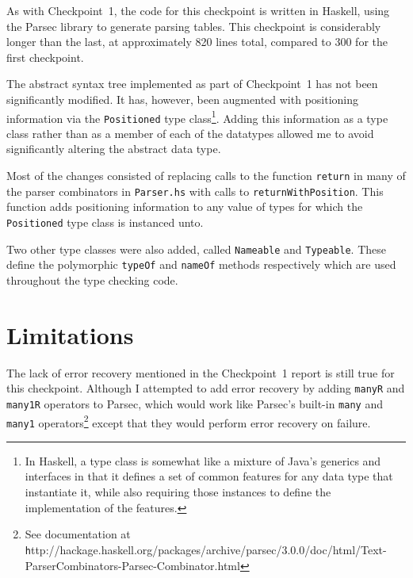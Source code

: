 \documentclass[12pt]{amsart}
\begin{document}
As with Checkpoint~1, the code for this checkpoint is written in
Haskell, using the Parsec library to generate parsing tables. This
checkpoint is considerably longer than the last, at approximately 820
lines total, compared to 300 for the first checkpoint.

The abstract syntax tree implemented as part of Checkpoint~1 has not
been significantly modified. It has, however, been augmented with
positioning information via the \verb|Positioned| type
class\footnote{In Haskell, a type class is somewhat like a mixture of
  Java's generics and interfaces in that it defines a set of common
  features for any data type that instantiate it, while also requiring
  those instances to define the implementation of the
  features.}. Adding this information as a type class rather than as a
member of each of the datatypes allowed me to avoid significantly
altering the abstract data type. 

Most of the changes consisted of replacing calls to the function
\verb|return| in many of the parser combinators in \verb|Parser.hs|
with calls to \verb|returnWithPosition|. This function adds
positioning information to any value of types for which the
\verb|Positioned| type class is instanced unto.

Two other type classes were also added, called \verb|Nameable| and
\verb|Typeable|. These define the polymorphic \verb|typeOf| and
\verb|nameOf| methods respectively which are used throughout the type
checking code.

\section{Limitations}
The lack of error recovery mentioned in the Checkpoint~1 report is
still true for this checkpoint. Although I attempted to add error
recovery by adding \verb|manyR| and \verb|many1R| operators to Parsec,
which would work like Parsec's built-in \verb|many| and \verb|many1|
operators\footnote{See documentation at {\texttt
    http://hackage.haskell.org/packages/archive/parsec/3.0.0/doc/html/Text-ParserCombinators-Parsec-Combinator.html}}
except that they would perform error recovery on failure.
\end{document}
